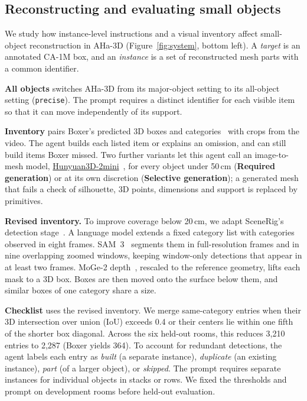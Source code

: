 \subsection{Reconstructing and evaluating small objects}
\label{sec:small-method}
We study how instance-level instructions and a visual inventory affect
small-object reconstruction in AHa-3D (Figure~\ref{fig:system}, bottom left).
A \emph{target} is an annotated CA-1M box, and an \emph{instance} is a
set of reconstructed mesh parts with a common identifier.

\textbf{All objects} switches AHa-3D from its major-object setting to its
all-object setting (\texttt{precise}). The prompt requires a distinct
identifier for each visible item so that it can move independently of its support.


\textbf{Inventory} pairs Boxer's predicted 3D boxes and categories~\cite{boxer}
with crops from the video. The agent builds each listed item or explains an
omission, and can still build items Boxer missed. Two further variants let
this agent call an image-to-mesh model,
\href{https://huggingface.co/tencent/Hunyuan3D-2mini}{Hunyuan3D-2mini}~\cite{hunyuan3d2}, for
every object under 50\,cm (\textbf{Required generation}) or at its own
discretion (\textbf{Selective generation}); a generated mesh that fails a
check of silhouette, 3D points, dimensions and support is replaced by
primitives.

\textbf{Revised inventory.}
To improve coverage below 20\,cm, we adapt SceneRig's detection
stage~\cite{scenerig}. A language model extends a fixed category list
with categories observed in eight frames. SAM~3~\cite{sam3} segments them in
full-resolution frames and in nine overlapping zoomed windows, keeping
window-only detections that appear in at least two frames. MoGe-2
depth~\cite{moge2}, rescaled to the reference geometry, lifts each mask to a
3D box. Boxes are then moved onto the surface below them, and similar boxes
of one category share a size.

\textbf{Checklist} uses the revised inventory. We merge same-category
entries when their 3D intersection over union (IoU) exceeds 0.4 or their
centers lie within one fifth of the shorter box diagonal. Across the six
held-out rooms, this reduces 3{,}210 entries to 2{,}287 (Boxer yields 364).
To account for redundant detections, the agent labels each entry as
\emph{built} (a separate instance), \emph{duplicate} (an existing instance),
\emph{part} (of a larger object), or \emph{skipped}. The prompt requires
separate instances for individual objects in stacks or rows. We fixed the
thresholds and prompt on development rooms before held-out evaluation.

